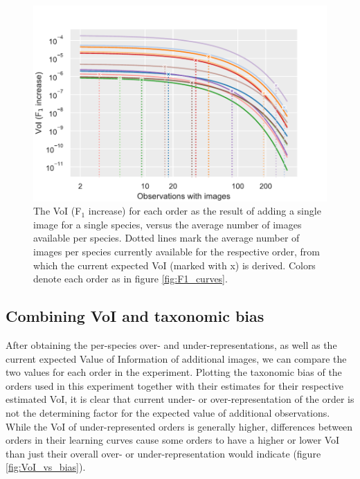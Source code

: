 \documentclass{article}
\begin{document}
\begin{figure}[!ht]
  \includegraphics[width=\textwidth]{3}
  \caption{\footnotesize The VoI (F\(_1\) increase) for each order as the result of adding a single image for a single species, versus the average number of images available per species. Dotted lines mark the average number of images per species currently available for the respective order, from which the current expected VoI (marked with x) is derived. Colors denote each order as in figure \ref{fig:F1_curves}.  }
  \label{fig:VoI_curves}
\end{figure}

\subsection*{Combining VoI and taxonomic bias}
After obtaining the per-species over- and under-representations, as well as the current expected Value of Information of additional images, we can compare the two values for each order in the experiment. Plotting the taxonomic bias of the orders used in this experiment together with their estimates for their respective estimated VoI, it is clear that current under- or over-representation of the order is not the determining factor for the expected value of additional observations. While the VoI of under-represented orders is generally higher, differences between orders in their learning curves cause some orders to have a higher or lower VoI than just their overall over- or under-representation would indicate (figure \ref{fig:VoI_vs_bias}).
\end{document}
